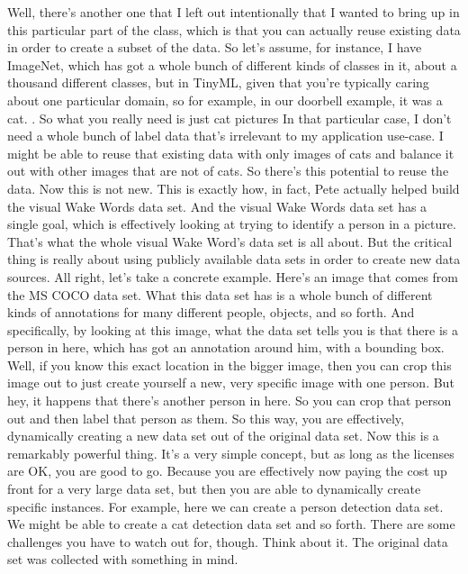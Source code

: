   Well, there's another one that I left out intentionally
  that I wanted to bring up in this particular part of the class, which
  is that you can actually reuse existing data in order
  to create a subset of the data.
  So let's assume, for instance, I have ImageNet,
  which has got a whole bunch of different kinds of classes in it,
  about a thousand different classes, but in TinyML,
  given that you're typically caring about one particular domain, so for example,
  in our doorbell example, it was a cat. .
  So what you really need is just cat pictures In that particular case,
  I don't need a whole bunch of label data that's
  irrelevant to my application use-case.
  I might be able to reuse that existing data with only images of cats
  and balance it out with other images that are not of cats.
  So there's this potential to reuse the data.
  Now this is not new.
  This is exactly how, in fact, Pete actually
  helped build the visual Wake Words data set.
  And the visual Wake Words data set has a single goal,
  which is effectively looking at trying to identify a person in a picture.
  That's what the whole visual Wake Word's data set is all about.
  But the critical thing is really about using publicly available data sets
  in order to create new data sources.
  All right, let's take a concrete example.
  Here's an image that comes from the MS COCO data set.
  What this data set has is a whole bunch of different kinds
  of annotations for many different people, objects, and so forth.
  And specifically, by looking at this image, what the data set
  tells you is that there is a person in here,
  which has got an annotation around him, with a bounding box.
  Well, if you know this exact location in the bigger image,
  then you can crop this image out to just create yourself a new, very specific
  image with one person.
  But hey, it happens that there's another person in here.
  So you can crop that person out and then label that person as them.
  So this way, you are effectively, dynamically creating a new data set out
  of the original data set.
  Now this is a remarkably powerful thing.
  It's a very simple concept, but as long as the licenses are OK,
  you are good to go.
  Because you are effectively now paying the cost up front for a very large data
  set, but then you are able to dynamically create specific instances.
  For example, here we can create a person detection data set.
  We might be able to create a cat detection data set and so forth.
  There are some challenges you have to watch out for, though.
  Think about it.
  The original data set was collected with something in mind.
